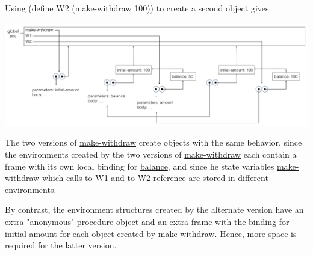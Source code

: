 \documentclass[11pt, oneside]{article}
\begin{document}
Using (define W2 (make-withdraw 100)) to create a second object gives

\begin{center}
    \includegraphics[width=15cm]{ex-3.10-4.png}
\end{center}

The two versions of \url{make-withdraw} create objects with the same behavior, since the environments created by the two versions of \url{make-withdraw} each contain a frame with its own local binding for \url{balance}, and since he state variables \url{make-withdraw} which calls to \url{W1} and to \url{W2} reference are stored in different environments.

By contrast, the environment structures created by the alternate version have an extra "anonymous" procedure object and an extra frame with the binding for \url{initial-amount} for each object created by \url{make-withdraw}. Hence, more space is required for the latter version.
\end{document}
